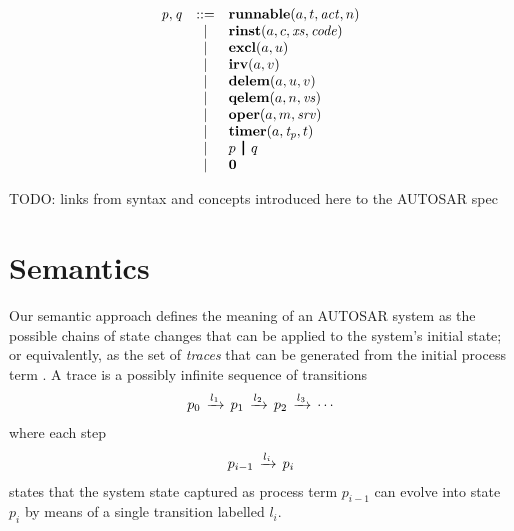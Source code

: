 \documentclass[twocolumn]{article}
\begin{document}
\[
\begin{array}{rcll}
  \V{P},\V{Q}
        & ::= & \Trunnable a t {\Act} n      \\
        & |   & \Trinst a c {\Xs} {\Code}    \\
        & |   & \Texcl a u                   \\
        & |   & \Tirv a v                    \\
        & |   & \Tdelem a u v                \\
        & |   & \Tqelem a n {\Vs}            \\
        & |   & \Toper a m \Srv              \\
        & |   & \Ttimer a {\V{T_p}} t        \\
        & |   & \Tpar p q                    \\
        & |   & \Tzero                       \\
\end{array}
\]

TODO: links from syntax and concepts introduced here to the AUTOSAR spec


\section{Semantics}
\label{sec:Sem}

Our semantic approach defines the meaning of an AUTOSAR system as the possible chains of state changes that can be applied to the system's initial state; or equivalently, as the set of \emph{traces} that can be generated from the initial process term . A trace is a possibly infinite sequence of transitions
\[
\begin{array}{c}
  {p_0} \,\xrightarrow{l_1}\, {p_1} \,\xrightarrow{l_2}\, {p_2} \,\xrightarrow{l_3}\, \cdots
\end{array}
\]
where each step
\[
\begin{array}{c}
  {p_{i-1}} \,\xrightarrow{l_i}\, {p_i}
\end{array}
\]
states that the system state captured as process term $p_{i-1}$ can evolve into state $p_i$ by means of a single transition labelled $l_i$.
\end{document}
